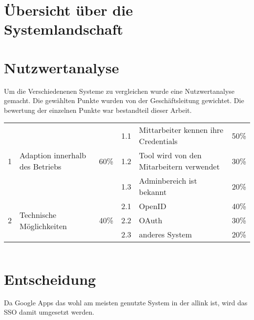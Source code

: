 \section{Übersicht über die Systemlandschaft}
\label{sec:Übersicht über die Systemlandschaft}

\section{Nutzwertanalyse}
\label{sec:Nutzwertanalyse}
Um die Verschiedenenen Systeme zu vergleichen wurde eine Nutzwertanalyse
gemacht. Die gewählten Punkte wurden von der Geschäftsleitung gewichtet. Die
bewertung der einzelnen Punkte war bestandteil dieser Arbeit.

\begin{tabular}{|r l|r|r l|r|}
\hline 
\multirow{3}{*}{1} & \multirow{3}{*}{Adaption innerhalb des Betriebs} & \multirow{3}{*}{60\%} & 1.1 & Mittarbeiter kennen ihre Credentials & 50\%\tabularnewline
\cline{4-6} 
 &  &  & 1.2 & Tool wird von den Mitarbeitern verwendet & 30\%\tabularnewline
\cline{4-6} 
 &  &  & 1.3 & Adminbereich ist bekannt & 20\%\tabularnewline
\hline 
\multirow{3}{*}{2} & \multirow{3}{*}{Technische Möglichkeiten} & \multirow{3}{*}{40\%} & 2.1 & OpenID & 40\%\tabularnewline
\cline{4-6} 
 &  &  & 2.2 & OAuth & 30\%\tabularnewline
\cline{4-6} 
 &  &  & 2.3 & anderes System & 20\%\tabularnewline
\hline 
\end{tabular}

\begin{tabular}{|l|r|r|r|}
\end{tabular}

\section{Entscheidung}
\label{sec:Entscheidung}
Da Google Apps das wohl am meisten genutzte System in der allink ist, wird das SSO damit umgesetzt werden.